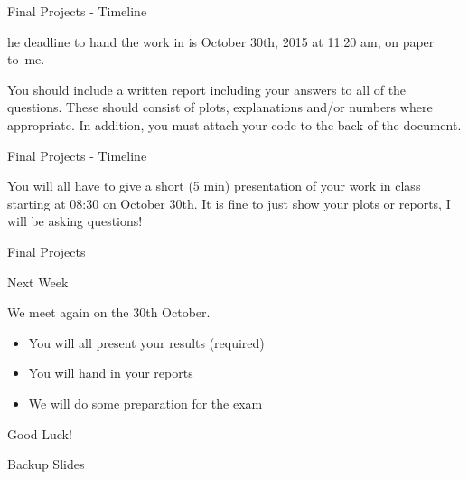 \documentclass{beamer}
\begin{document}
\begin{frame}{Final Projects - Timeline}

he deadline to hand the work in is October 30th, 2015 at 11:20 am, on paper to\
 me.

\vspace{5mm}

You should include a written report including your answers to all of the questions.  These should consist of plots, explanations and/or numbers where appropriate.  In addition, you must attach your code to the back of the document.

\end{frame}

\begin{frame}{Final Projects - Timeline}


You will all have to give a short (5 min) presentation of your work in class starting at 08:30 on October 30th.  It is fine to just show your plots or reports, I will be asking questions!
\end{frame}


\begin{frame}{Final Projects}

\end{frame}


\begin{frame}{Next Week}

We meet again on the 30th October.  

\begin{itemize}
\item You will all present your results (required)
\item You will hand in your reports
\item We will do some preparation for the exam
\end{itemize}

\end{frame}

\begin{frame}{Good Luck!}

\end{frame}







\appendix
{}
\setcounter{finalframe}{\value{framenumber}}

\begin{frame}{Backup Slides}
\end{frame}




\setcounter{framenumber}{\value{finalframe}}
\end{document}
